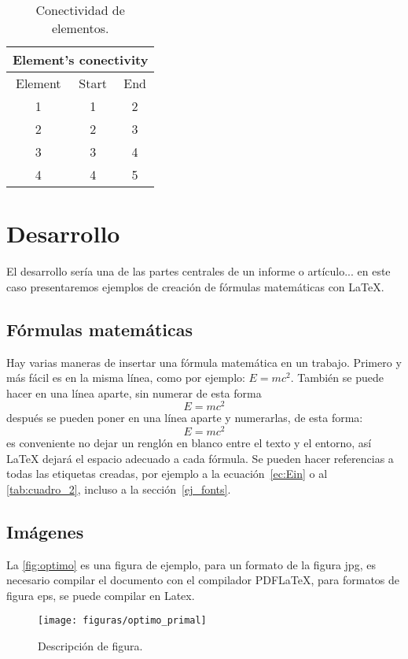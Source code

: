 \documentclass[a4paper,11pt]{article}
\begin{document}
\begin{table}[h]
	\centering
	\caption{Conectividad de elementos.} 
	\begin{tabular}{|c|c|c|}
		\toprule[0.8mm]                                                                 
		\multicolumn{3}{|c|}{Element's conectivity    }  \\  
		\midrule[0.5mm]                                  
		Element & Start & End \\ \midrule[0.5mm]                                                                                                                                                     
		1 &    1 &    2 \\
		2 &    2 &    3 \\
		3 &    3 &    4 \\
		4 &    4 &    5 \\
		\bottomrule[0.8mm]                                        
	\end{tabular}%
	\label{tab:conectividad}%
\end{table}%



\section{Desarrollo}
%
El desarrollo sería una de las partes centrales de un informe o artículo... en este caso presentaremos ejemplos de creación de fórmulas matemáticas con \LaTeX.

\subsection{Fórmulas matemáticas}
Hay varias maneras de insertar una fórmula matemática en un trabajo. Primero y más fácil es en la misma línea, como por ejemplo: $E=mc^{2}$. También se puede hacer en una línea aparte, sin numerar de esta forma $$E=mc^{2}$$ después se pueden poner en una línea aparte y numerarlas, de esta forma: 
\begin{equation}\label{ec:Ein}
  E=mc^{2}
\end{equation} %
%
es conveniente no dejar un renglón en blanco entre el texto y el entorno, así LaTeX dejará el espacio adecuado a cada fórmula. Se pueden hacer referencias a todas las etiquetas creadas, por ejemplo a la ecuación~\eqref{ec:Ein} o al \autoref{tab:cuadro_2}, incluso a la sección~\ref{ej_fonts}.


\subsection{Imágenes}
%
La \autoref{fig:optimo} es una figura de ejemplo, para un formato de la figura jpg, es necesario compilar el documento con el compilador PDFLaTeX, para formatos de figura eps, se puede compilar en Latex.
\begin{figure}[h!]
\centering
\texttt{[image: figuras/optimo\_primal]}
\caption{Descripción de figura.}
\label{fig:optimo}
\end{figure}
\end{document}
